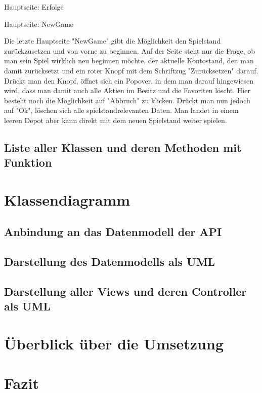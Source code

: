 \documentclass[10pt]{scrartcl}
\begin{document}
Hauptseite: Erfolge


Hauptseite: NewGame

Die letzte Hauptseite "NewGame" gibt die Möglichkeit den Spielstand zurückzusetzen und von vorne zu beginnen. 
Auf der Seite steht nur die Frage, ob man sein Spiel wirklich neu beginnen möchte, der aktuelle Kontostand, den man damit zurücksetzt und ein roter Knopf mit dem Schriftzug "Zurücksetzen" darauf. Drückt man den Knopf, öffnet sich ein Popover, in dem man darauf hingewiesen wird, dass man damit auch alle Aktien im Besitz und die Favoriten löscht. Hier besteht noch die Möglichkeit auf "Abbruch" zu klicken. Drückt man nun jedoch auf "Ok", löschen sich alle spielstandrelevanten Daten. Man landet in einem leeren Depot aber kann direkt mit dem neuen Spielstand weiter spielen.

\subsection{Liste aller Klassen und deren Methoden mit Funktion}

\section{Klassendiagramm}

\subsection{Anbindung an das Datenmodell der API}

\subsection{Darstellung des Datenmodells als UML}

\subsection{Darstellung aller Views und deren Controller als UML}

\section{Überblick über die Umsetzung}

\section{Fazit}
\end{document}
